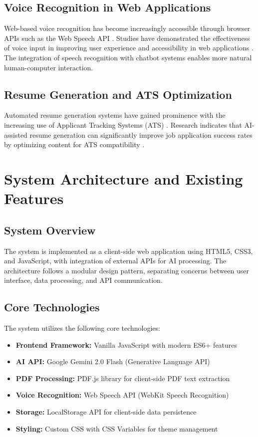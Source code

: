 \documentclass[conference]{IEEEtran}
\begin{document}
\subsection{Voice Recognition in Web Applications}
Web-based voice recognition has become increasingly accessible through browser APIs such as the Web Speech API \cite{w3c2023}. Studies have demonstrated the effectiveness of voice input in improving user experience and accessibility in web applications \cite{pradhan2018}. The integration of speech recognition with chatbot systems enables more natural human-computer interaction.

\subsection{Resume Generation and ATS Optimization}
Automated resume generation systems have gained prominence with the increasing use of Applicant Tracking Systems (ATS) \cite{black2020}. Research indicates that AI-assisted resume generation can significantly improve job application success rates by optimizing content for ATS compatibility \cite{raghavan2020}.

\section{System Architecture and Existing Features}

\subsection{System Overview}
The system is implemented as a client-side web application using HTML5, CSS3, and JavaScript, with integration of external APIs for AI processing. The architecture follows a modular design pattern, separating concerns between user interface, data processing, and API communication.

\subsection{Core Technologies}
The system utilizes the following core technologies:
\begin{itemize}[itemsep=0pt, parsep=0pt, leftmargin=*]
    \item \textbf{Frontend Framework:} Vanilla JavaScript with modern ES6+ features
    \item \textbf{AI API:} Google Gemini 2.0 Flash (Generative Language API) \cite{google2024}
    \item \textbf{PDF Processing:} PDF.js library for client-side PDF text extraction \cite{mozilla2024}
    \item \textbf{Voice Recognition:} Web Speech API (WebKit Speech Recognition)
    \item \textbf{Storage:} LocalStorage API for client-side data persistence
    \item \textbf{Styling:} Custom CSS with CSS Variables for theme management
\end{itemize}
\end{document}
